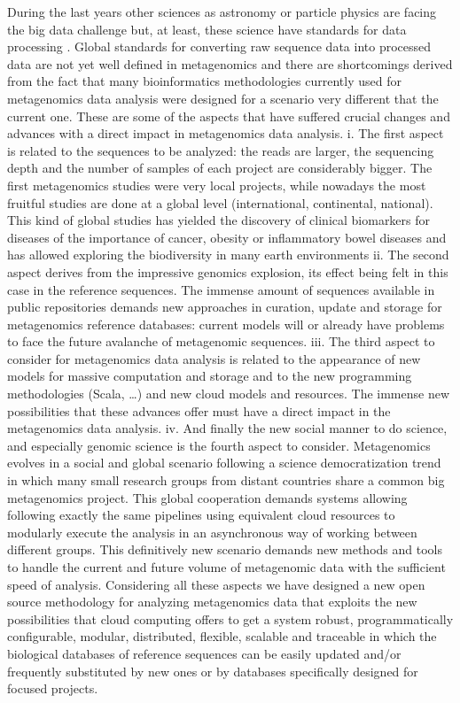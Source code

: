 \documentclass{frontiersSCNS} %
\begin{document}
During the last years other sciences as astronomy or particle physics
are facing the big data challenge but, at least, these science have
standards for data processing \citep{Stephens-2015}. Global standards
for converting raw sequence data into processed data are not yet well
defined in metagenomics and there are shortcomings derived from the fact
that many bioinformatics methodologies currently used for metagenomics
data analysis were designed for a scenario very different that the
current one. These are some of the aspects that have suffered crucial
changes and advances with a direct impact in metagenomics data analysis.
i. The first aspect is related to the sequences to be analyzed: the
reads are larger, the sequencing depth and the number of samples of each
project are considerably bigger. The first metagenomics studies were
very local projects, while nowadays the most fruitful studies are done
at a global level (international, continental, national). This kind of
global studies has yielded the discovery of clinical biomarkers for
diseases of the importance of cancer, obesity or inflammatory bowel
diseases and has allowed exploring the biodiversity in many earth
environments ii. The second aspect derives from the impressive genomics
explosion, its effect being felt in this case in the reference
sequences. The immense amount of sequences available in public
repositories demands new approaches in curation, update and storage for
metagenomics reference databases: current models will or already have
problems to face the future avalanche of metagenomic sequences. iii. The
third aspect to consider for metagenomics data analysis is related to
the appearance of new models for massive computation and storage and to
the new programming methodologies (Scala, \ldots{}) and new cloud models
and resources. The immense new possibilities that these advances offer
must have a direct impact in the metagenomics data analysis. iv. And
finally the new social manner to do science, and especially genomic
science is the fourth aspect to consider. Metagenomics evolves in a
social and global scenario following a science democratization trend in
which many small research groups from distant countries share a common
big metagenomics project. This global cooperation demands systems
allowing following exactly the same pipelines using equivalent cloud
resources to modularly execute the analysis in an asynchronous way of
working between different groups. This definitively new scenario demands
new methods and tools to handle the current and future volume of
metagenomic data with the sufficient speed of analysis. Considering all
these aspects we have designed a new open source methodology for
analyzing metagenomics data that exploits the new possibilities that
cloud computing offers to get a system robust, programmatically
configurable, modular, distributed, flexible, scalable and traceable in
which the biological databases of reference sequences can be easily
updated and/or frequently substituted by new ones or by databases
specifically designed for focused projects.
\end{document}
